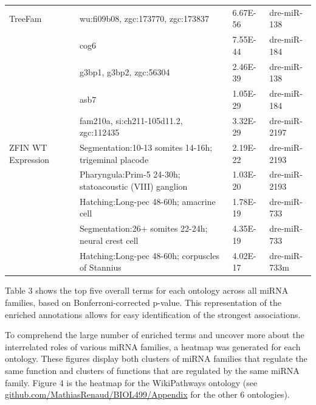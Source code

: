 \documentclass[12pt]{article}
\begin{document}
\begin{table}[h!]
{\begin{tabular}{llll}
TreeFam               & wu:fi09b08, zgc:173770, zgc:173837                      & 6.67E-56         & dre-miR-138            \\
                      & cog6                                                    & 7.55E-44         & dre-miR-184            \\
                      & g3bp1, g3bp2, zgc:56304                                 & 2.46E-39         & dre-miR-138            \\
                      & asb7                                                    & 1.05E-29         & dre-miR-184            \\
                      & fam210a, si:ch211-105d11.2, zgc:112435                  & 3.32E-29         & dre-miR-2197           \\\hline
ZFIN WT Expression    & Segmentation:10-13 somites 14-16h; trigeminal placode   & 2.19E-22         & dre-miR-2193           \\
                      & Pharyngula:Prim-5 24-30h; statoacoustic (VIII) ganglion & 1.03E-20         & dre-miR-2193           \\
                      & Hatching:Long-pec 48-60h; amacrine cell                 & 1.78E-19         & dre-miR-733            \\
                      & Segmentation:26+ somites 22-24h; neural crest cell      & 4.35E-19         & dre-miR-733            \\
                      & Hatching:Long-pec 48-60h; corpuscles of Stannius        & 4.02E-17         & dre-miR-733m \\\hline
\end{tabular}
}

\begin{flushleft}{\scriptsize Table 3 shows the top five overall terms for each ontology across all miRNA families, based on Bonferroni-corrected p-value. This representation of the enriched annotations allows for easy identification of the strongest associations.}\end{flushleft}
\label{1}
\end{table}
To comprehend the large number of enriched terms and uncover more about the interrelated roles of various miRNA families, a heatmap was generated for each ontology. These figures display both clusters of miRNA families that regulate the same function and clusters of functions that are regulated by the same miRNA family. Figure 4 is the heatmap for the WikiPathways ontology (see \url{github.com/MathiasRenaud/BIOL499/Appendix} for the other 6 ontologies).
\end{document}
